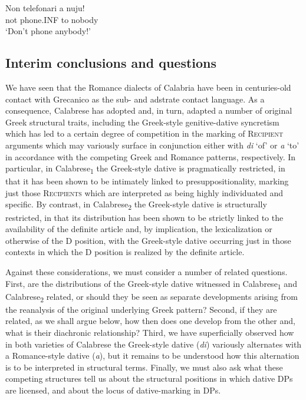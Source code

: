 \documentclass[output=paper,modfonts,nonflat,colorlinks,citecolor=brown]{langsci/langscibook}
\begin{document}
\ex  
    \gll Non  telefonari  a  nuju!\\
    not  phone.INF   to  nobody\\
    \glt `Don’t phone anybody!'
\z
\z

\subsection{Interim conclusions and questions}

We have seen that the Romance dialects of Calabria have been in centuries-old contact with Grecanico as the sub- and adstrate contact language. As a consequence, Calabrese has adopted and, in turn, adapted a number of original Greek structural traits, including the Greek-style genitive-dative syncretism which has led to a certain degree of competition in the marking of \textsc{Recipient} arguments which may variously surface in conjunction either with \textit{di} ‘of’ or \textit{a} ‘to’ in accordance with the competing Greek and Romance patterns, respectively. In particular, in Calabrese\textsubscript{1} the Greek-style dative is pragmatically restricted, in that it has been shown to be intimately linked to presuppositionality, marking just those \textsc{Recipients} which are interpreted as being highly individuated and specific. By contrast, in Calabrese\textsubscript{2} the Greek-style dative is structurally restricted, in that its distribution has been shown to be strictly linked to the availability of the definite article and, by implication, the lexicalization or otherwise of the D position, with the Greek-style dative occurring just in those contexts in which the D position is realized by the definite article.

Against these considerations, we must consider a number of related questions. First, are the distributions of the Greek-style dative witnessed in Calabrese\textsubscript{1} and Calabrese\textsubscript{2} related, or should they be seen as separate developments arising from the reanalysis of the original underlying Greek pattern? Second, if they are related, as we shall argue below, how then does one develop from the other and, what is their diachronic relationship? Third, we have superficially observed how in both varieties of Calabrese the Greek-style dative (\textit{di}) variously alternates with a Romance-style dative (\textit{a}), but it remains to be understood how this alternation is to be interpreted in structural terms. Finally, we must also ask what these competing structures tell us about the structural positions in which dative DPs are licensed, and about the locus of dative-marking in DPs.
\end{document}
